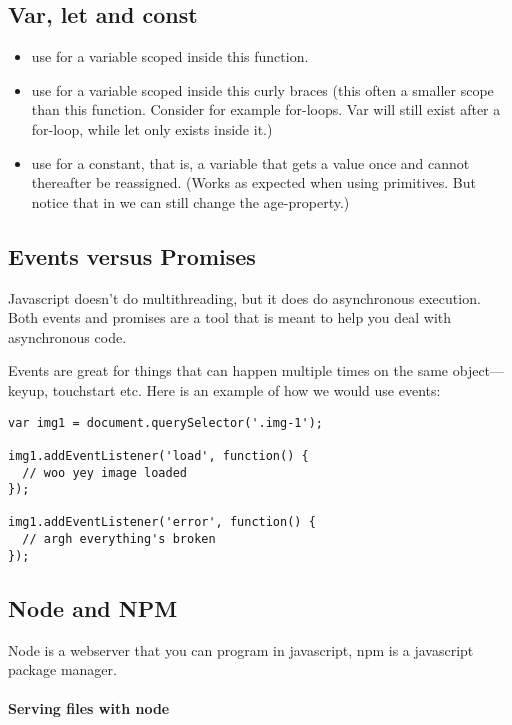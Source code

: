 \subsection{Var, let and const}
\begin{itemize}
    \item use  for a variable scoped inside this function. 
    \item use  for a variable scoped inside this curly braces (this often a smaller scope than this function. Consider for example for-loops. Var will still exist after a for-loop, while let only exists inside it.) 
    \item use  for a constant, that is, a variable that gets a value once and cannot  thereafter be reassigned. (Works as expected when using primitives. But notice that in  we can still change the age-property.)
\end{itemize}


\subsection{Events versus Promises}
Javascript doesn't do multithreading, but it does do asynchronous execution. Both events and promises are a tool that is meant to help you deal with asynchronous code. 

Events are great for things that can happen multiple times on the same object—keyup, touchstart etc. Here is an example of how we would use events: 
\begin{lstlisting}
var img1 = document.querySelector('.img-1');

img1.addEventListener('load', function() {
  // woo yey image loaded
});

img1.addEventListener('error', function() {
  // argh everything's broken
});

\end{lstlisting}


\subsection{Node and NPM}
Node is a webserver that you can program in javascript, npm is a javascript package manager. 

\paragraph{Serving files with node}

